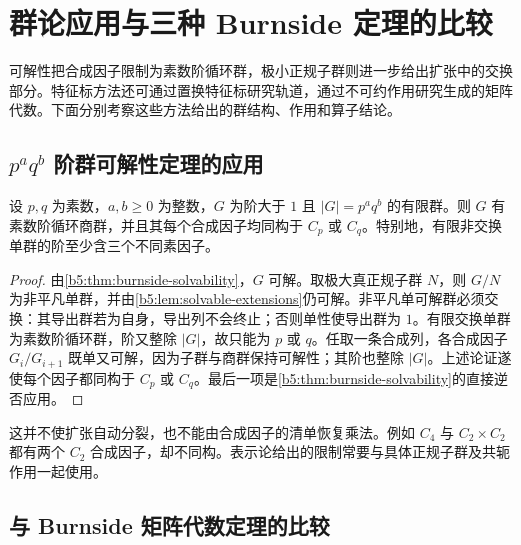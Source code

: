 
\section{群论应用与三种 Burnside 定理的比较}
\label{b5:sec:0506}

可解性把合成因子限制为素数阶循环群，极小正规子群则进一步给出扩张中的交换部分。特征标方法还可通过置换特征标研究轨道，通过不可约作用研究生成的矩阵代数。下面分别考察这些方法给出的群结构、作用和算子结论。

\subsection{\texorpdfstring{\(p^aq^b\) 阶群可解性定理的应用}{paqb 阶群可解性定理的应用}}
\label{b5:subsec:0506:01}

\begin{corollary}\label{b5:cor:two-prime-composition}
	设 \(p,q\) 为素数，\(a,b\ge0\) 为整数，\(G\) 为阶大于 \(1\) 且 \(|G|=p^a q^b\) 的有限群。则 \(G\) 有素数阶循环商群，并且其每个合成因子均同构于 \(C_p\) 或 \(C_q\)。特别地，有限非交换单群的阶至少含三个不同素因子。
\end{corollary}
\begin{proof}
	由\cref{b5:thm:burnside-solvability}，\(G\) 可解。取极大真正规子群 \(N\)，则 \(G/N\) 为非平凡单群，并由\cref{b5:lem:solvable-extensions}仍可解。非平凡单可解群必须交换：其导出群若为自身，导出列不会终止；否则单性使导出群为 \(1\)。有限交换单群为素数阶循环群，阶又整除 \(|G|\)，故只能为 \(p\) 或 \(q\)。任取一条合成列，各合成因子 \(G_i/G_{i+1}\) 既单又可解，因为子群与商群保持可解性；其阶也整除 \(|G|\)。上述论证遂使每个因子都同构于 \(C_p\) 或 \(C_q\)。最后一项是\cref{b5:thm:burnside-solvability}的直接逆否应用。
\end{proof}

这并不使扩张自动分裂，也不能由合成因子的清单恢复乘法。例如 \(C_4\) 与 \(C_2\times C_2\) 都有两个 \(C_2\) 合成因子，却不同构。表示论给出的限制常要与具体正规子群及共轭作用一起使用。

\subsection{与 Burnside 矩阵代数定理的比较}
\label{b5:subsec:0506:02}

